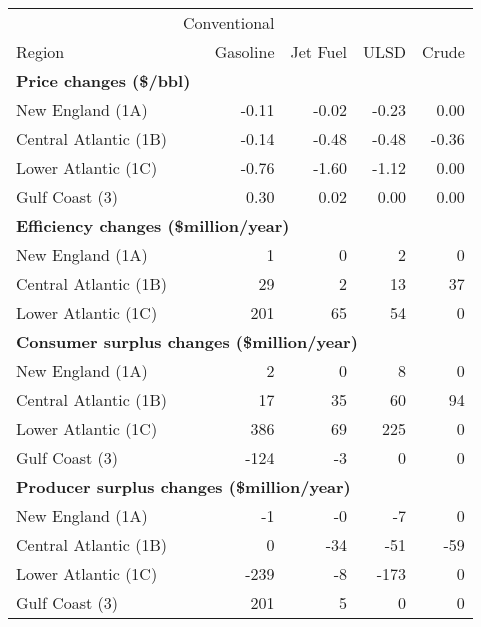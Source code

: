 \begin{tabular}{lrrrr}
  \hline
   & Conventional & &  & \\

                    Region & Gasoline & Jet Fuel & ULSD & Crude \\ 
                    \midrule \multicolumn{5}{l}{\textbf{Price changes (\$/bbl)}} \\
New England (1A) & -0.11 & -0.02 & -0.23 & 0.00 \\ 
  Central Atlantic (1B) & -0.14 & -0.48 & -0.48 & -0.36 \\ 
  Lower Atlantic (1C) & -0.76 & -1.60 & -1.12 & 0.00 \\ 
  Gulf Coast (3) & 0.30 & 0.02 & 0.00 & 0.00 \\ 
   \midrule \multicolumn{5}{l}{\textbf{Efficiency changes (\$million/year)}} \\
New England (1A) & 1 & 0 & 2 & 0 \\ 
  Central Atlantic (1B) & 29 & 2 & 13 & 37 \\ 
  Lower Atlantic (1C) & 201 & 65 & 54 & 0 \\ 
   \midrule \multicolumn{5}{l}{\textbf{Consumer surplus changes (\$million/year)}} \\
New England (1A) & 2 & 0 & 8 & 0 \\ 
  Central Atlantic (1B) & 17 & 35 & 60 & 94 \\ 
  Lower Atlantic (1C) & 386 & 69 & 225 & 0 \\ 
  Gulf Coast (3) & -124 & -3 & 0 & 0 \\ 
   \midrule \multicolumn{5}{l}{\textbf{Producer surplus changes (\$million/year)}} \\
New England (1A) & -1 & -0 & -7 & 0 \\ 
  Central Atlantic (1B) & 0 & -34 & -51 & -59 \\ 
  Lower Atlantic (1C) & -239 & -8 & -173 & 0 \\ 
  Gulf Coast (3) & 201 & 5 & 0 & 0 \\ 
   \hline
\end{tabular}
